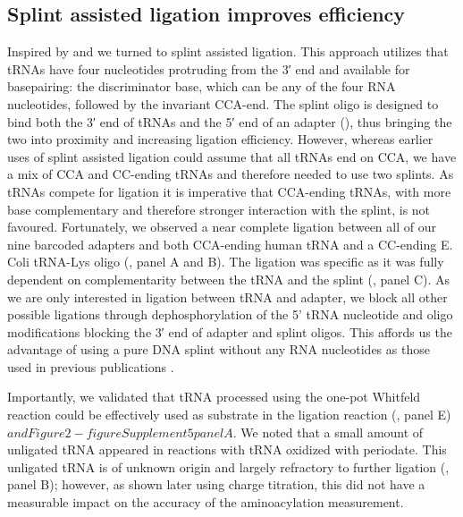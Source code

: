 \documentclass[9pt,lineno]{elife}
\begin{document}
\subsection{Splint assisted ligation improves efficiency}
Inspired by \cite{Smith2015-ht} and \cite{Shigematsu2017-tv} we turned to splint assisted ligation.
This approach utilizes that tRNAs have four nucleotides protruding from the 3′ end and available for basepairing: the discriminator base, which can be any of the four RNA nucleotides, followed by the invariant CCA-end.
The splint oligo is designed to bind both the 3′ end of tRNAs and the 5′ end of an adapter (), thus bringing the two into proximity and increasing ligation efficiency.
However, whereas earlier uses of splint assisted ligation could assume that all tRNAs end on CCA, we have a mix of CCA and CC-ending tRNAs and therefore needed to use two splints.
As tRNAs compete for ligation it is imperative that CCA-ending tRNAs, with more base complementary and therefore stronger interaction with the splint, is not favoured.
Fortunately, we observed a near complete ligation between all of our nine barcoded adapters and both CCA-ending human tRNA and a CC-ending E. Coli tRNA-Lys oligo (, panel A and B).
The ligation was specific as it was fully dependent on complementarity between the tRNA and the splint (, panel C).
As we are only interested in ligation between tRNA and adapter, we block all other possible ligations through dephosphorylation of the 5' tRNA nucleotide and oligo modifications blocking the 3′ end of adapter and splint oligos.
This affords us the advantage of using a pure DNA splint without any RNA nucleotides as those used in previous publications \citep{Smith2015-ht, Shigematsu2017-tv, Pinkard2020-yd, Warren2021-wt, Thomas2021-fi, Lucas2023-vm}.

Importantly, we validated that tRNA processed using the one-pot Whitfeld reaction could be effectively used as substrate in the ligation reaction (, panel E) $and Figure 2 - figure Supplement 5 panel A$.
We noted that a small amount of unligated tRNA appeared in reactions with tRNA oxidized with periodate.
This unligated tRNA is of unknown origin and largely refractory to further ligation (, panel B); however, as shown later using charge titration, this did not have a measurable impact on the accuracy of the aminoacylation measurement.
\end{document}

